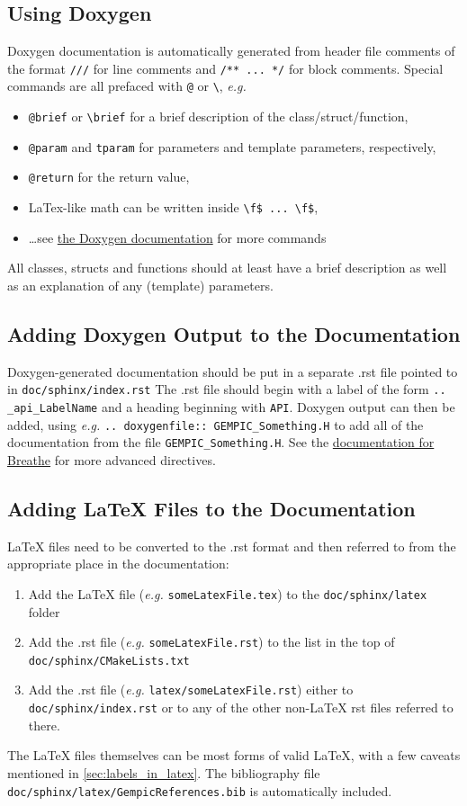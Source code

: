 \documentclass[11pt]{article}
\begin{document}
\subsection{Using Doxygen}
Doxygen documentation is automatically generated from header file comments of the format \verb|///| for line comments and \verb|/** ... */| for block comments. Special commands are all prefaced with \verb|@| or \verb|\|, \emph{e.g.}
\begin{itemize}
   \item \verb|@brief| or \verb|\brief| for a brief description of the class/struct/function,
   \item \verb|@param| and \verb|tparam| for parameters and template parameters, respectively, 
   \item \verb|@return| for the return value,
   \item LaTex-like math can be written inside \verb|\f$ ... \f$|,
   \item \ldots see \href{https://www.doxygen.nl/manual/commands.html}{the Doxygen documentation} for more commands
\end{itemize}
All classes, structs and functions should at least have a brief description as well as an explanation of any (template) parameters.

\subsection{Adding Doxygen Output to the Documentation}
Doxygen-generated documentation should be put in a separate .rst file pointed to in \verb|doc/sphinx/index.rst|
The .rst file should begin with a label of the form \verb|.. _api_LabelName| and a heading beginning with \verb|API|.
Doxygen output can then be added, using \emph{e.g.} \verb|.. doxygenfile:: GEMPIC_Something.H| to add all of the documentation from the file \verb|GEMPIC_Something.H|.
See the \href{https://breathe.readthedocs.io/en/latest/directives.html}{documentation for Breathe} for more advanced directives.

\subsection{Adding LaTeX Files to the Documentation}
LaTeX files need to be converted to the .rst format and then referred to from the appropriate place in the documentation:
\begin{enumerate}
   \item Add the LaTeX file (\emph{e.g.} \verb|someLatexFile.tex|) to the \verb|doc/sphinx/latex| folder
   \item Add the .rst file (\emph{e.g.} \verb|someLatexFile.rst|) to the list in the top of \verb|doc/sphinx/CMakeLists.txt|
   \item Add the .rst file (\emph{e.g.} \verb|latex/someLatexFile.rst|) either to \verb|doc/sphinx/index.rst| or to any of the other non-LaTeX rst files referred to there.
\end{enumerate}
The LaTeX files themselves can be most forms of valid LaTeX, with a few caveats mentioned in \ref{sec:labels_in_latex}. The bibliography file \verb|doc/sphinx/latex/GempicReferences.bib| is automatically included.
\end{document}

